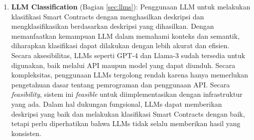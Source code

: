\begin{enumerate}

	\item \textbf{LLM Classification} (Bagian \ref{sec:llms}): Penggunaan LLM untuk melakukan klasifikasi Smart Contracts dengan menghasilkan deskripsi dan mengklasifikasikan berdasarkan deskripsi yang dihasilkan. Dengan memanfaatkan kemampuan LLM dalam memahami konteks dan semantik, diharapkan klasifikasi dapat dilakukan dengan lebih akurat dan efisien. Secara aksesibilitas, LLMs seperti GPT-4 dan Llama-3 sudah tersedia untuk digunakan, baik melalui API maupun model yang dapat diunduh. Secara kompleksitas, penggunaan LLMs tergolong rendah karena hanya memerlukan pengetahuan dasar tentang pemrograman dan penggunaan API. Secara \textit{feasibility}, sistem ini \textit{feasible} untuk diimplementasikan dengan infrastruktur yang ada. Dalam hal dukungan fungsional, LLMs dapat memberikan deskripsi yang baik dan melakukan klasifikasi Smart Contracts dengan baik, tetapi perlu diperhatikan bahwa LLMs tidak selalu memberikan hasil yang konsisten.


\end{enumerate}
